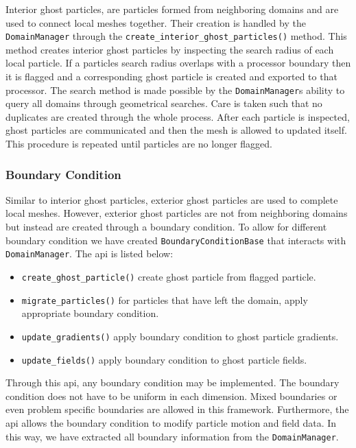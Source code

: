 Interior ghost particles, are particles formed from neighboring domains and are used to
connect local meshes together. Their creation is handled by the \lstinline{DomainManager}
through the \lstinline{create_interior_ghost_particles()} method. This method
creates interior ghost particles by inspecting the search radius of
each local particle. If a particles search radius overlaps with a processor
boundary then it is flagged and a corresponding ghost particle is created and exported to that processor.
The search method is made possible by the \lstinline{DomainManager}s ability to query
all domains through geometrical searches. Care is taken such that no duplicates are created through the 
whole process. After each particle is inspected, ghost particles are communicated and then the
mesh is allowed to updated itself. This procedure is repeated until particles are no longer flagged.

\subsubsection{Boundary Condition}
Similar to interior ghost particles, exterior ghost particles are used to
complete local meshes. However, exterior ghost particles are not from neighboring
domains but instead are created through a boundary condition. To allow for different
boundary condition we have created \lstinline{BoundaryConditionBase} that interacts
with \lstinline{DomainManager}. The api is listed below:
\begin{itemize}
	\item \lstinline{create_ghost_particle()} create ghost particle from flagged particle.
    \item \lstinline{migrate_particles()} for particles that have left the domain, apply
    appropriate boundary condition.
    \item \lstinline{update_gradients()} apply boundary condition to ghost particle gradients.
    \item \lstinline{update_fields()} apply boundary condition to ghost particle fields.
\end{itemize}
Through this api, any boundary condition may be implemented. The boundary condition does not have
to be uniform in each dimension. Mixed boundaries or even problem specific boundaries are allowed
in this framework. Furthermore, the api allows the boundary
condition to modify particle motion and field data. In this way, we have extracted all boundary
information from the \lstinline{DomainManager}.

